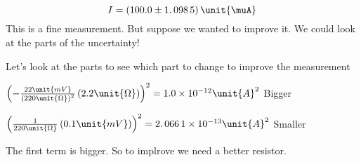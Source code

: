 \documentclass{article}
\begin{document}
$\allowbreak $

\[
I=\left( 100.0\pm 1.\,\allowbreak 098\,5\right) \unit{%
\mu%
A}
\]%
This is a fine measurement. But suppose we wanted to improve it. We could
look at the parts of the uncertainty!

Let's look at the parts to see which part to change to improve the
measurement

$\left( -\frac{22\unit{mV}}{\left( 220\unit{%
\Omega%
}\right) ^{2}}\left( 2.2\unit{%
\Omega%
}\right) \right) ^{2}=\allowbreak 1.0\times 10^{-12}\unit{A}^{2}$ Bigger

$\left( \frac{1}{220\unit{%
\Omega%
}}\left( 0.1\unit{mV}\right) \right) ^{2}=\allowbreak 2.\,\allowbreak
066\,1\times 10^{-13}\unit{A}^{2}$ Smaller

The first term is bigger. So to implrove we need a better resistor.
\end{document}
